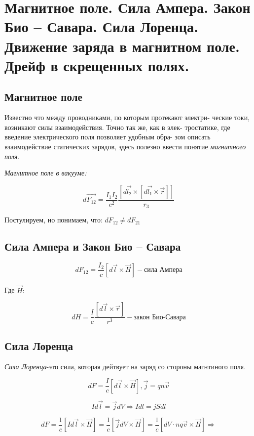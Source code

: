 \section{Магнитное поле. Сила Ампера. Закон Био – Савара. Сила Лоренца.
Движение заряда в магнитном поле. Дрейф в скрещенных полях.}
 
\subsection*{Магнитное поле}


Известно что между проводниками, по которым протекают электри-
ческие токи, возникают силы взаимодействия. Точно так же, как в элек-
тростатике, где введение электрического поля позволяет удобным обра-
зом описать взаимодействие статических зарядов, здесь полезно ввести
понятие \textit{магнитного поля}.

\textit{Магнитное поле в вакууме:}


\[
d\vec{F_{12}}= \frac{I_1 I_2 }{c^2} \frac{[d\vec{l_2}\times [d\vec{l_1}\times \vec{r}]]}{r_{3}}  
\]

Постулируем, но понимаем, что: $dF_{12}\neq dF_{21}$

\subsection*{Сила Ампера и Закон Био – Савара}

\[
dF_{12}=\frac{I_2}{c}[d\vec{l}\times \vec{H}]-\textit{сила Ампера}  
\]

Где $\vec{H}:$

\[
dH=\frac{I}{c} \frac{[d\vec{l} \times \vec{r}]}{r^3} - \textit{закон Био-Савара}  
\]

\subsection*{Сила Лоренца}


\textit{Сила Лоренца}-это сила, которая дейтвует на заряд со стороны магнтиного поля. 

\[
    dF=\frac{I}{c}[d\vec{l}\times \vec{H}],\vec{j}=qn\vec{v}
\]

\[
Id\vec{l}=\vec{j}dV \Rightarrow Idl=jSdl
\]

\[
dF=\frac{1}{c}[Id\vec{l}\times \vec{H}]=\frac{1}{c}[\vec{j}dV  \times \vec{H}]=\frac{1}{c} [dV\cdot nq\vec{v}\times \vec{H} ] \Rightarrow 
\]


